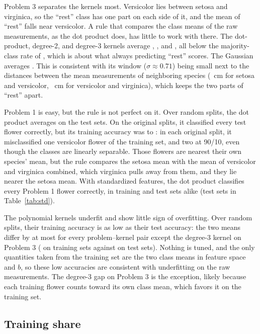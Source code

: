 Problem 3 separates the kernels most. Versicolor lies between setosa and virginica, so the ``rest'' class has one part on each side of it, and the mean of ``rest'' falls near versicolor. A rule that compares the class means of the raw measurements, as the dot product does, has little to work with there. The dot-product, degree-2, and degree-3 kernels average , , and , all below the majority-class rate of , which is about what always predicting ``rest'' scores. The Gaussian averages . This is consistent with its window ($\sigma \approx 0.71$) being small next to the distances between the mean measurements of neighboring species (~cm for setosa and versicolor, ~cm for versicolor and virginica), which keeps the two parts of ``rest'' apart.

Problem 1 is easy, but the rule is not perfect on it. Over random splits, the dot product averages  on the test sets. On the original splits, it classified every test flower correctly, but its training accuracy was  to : in each original split, it misclassified one versicolor flower of the training set, and two at 90/10, even though the classes are linearly separable. Those flowers are nearest their own species' mean, but the rule compares the setosa mean with the mean of versicolor and virginica combined, which virginica pulls away from them, and they lie nearer the setosa mean. With standardized features, the dot product classifies every Problem 1 flower correctly, in training and test sets alike (test sets in Table~\ref{tab:std}).

The polynomial kernels underfit and show little sign of overfitting. Over random splits, their training accuracy is as low as their test accuracy: the two means differ by at most  for every problem--kernel pair except the degree-3 kernel on Problem 3 ( on training sets against  on test sets). Nothing is tuned, and the only quantities taken from the training set are the two class means in feature space and $b$, so these low accuracies are consistent with underfitting on the raw measurements. The degree-3 gap on Problem 3 is the exception, likely because each training flower counts toward its own class mean, which favors it on the training set.

\subsection{Training share}

